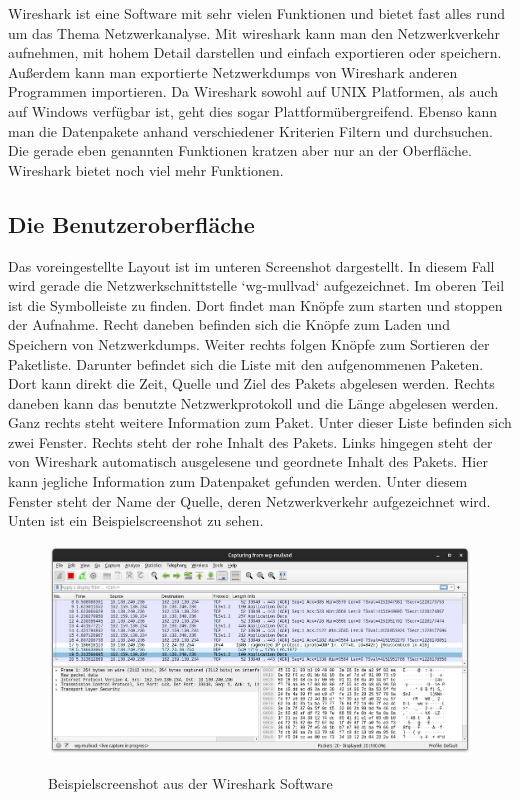 \documentclass[12pt]{article}
\begin{document}
Wireshark ist eine Software mit sehr vielen Funktionen und bietet fast alles rund um das Thema Netzwerkanalyse. Mit wireshark kann man den Netzwerkverkehr aufnehmen, mit hohem Detail darstellen und einfach exportieren oder speichern. Außerdem kann man exportierte Netzwerkdumps von Wireshark anderen Programmen importieren. Da Wireshark sowohl auf UNIX Platformen, als auch auf Windows verfügbar ist, geht dies sogar Plattformübergreifend. Ebenso kann man die Datenpakete anhand verschiedener Kriterien Filtern und durchsuchen. Die gerade eben genannten Funktionen kratzen aber nur an der Oberfläche. Wireshark bietet noch viel mehr Funktionen.\cite{features}

\subsection{Die Benutzeroberfläche}

Das voreingestellte Layout ist im unteren Screenshot dargestellt. In diesem Fall wird gerade die Netzwerkschnittstelle `wg-mullvad` aufgezeichnet. Im oberen Teil ist die Symbolleiste zu finden. Dort findet man Knöpfe zum starten und stoppen der Aufnahme.  Recht daneben befinden sich die Knöpfe zum Laden und Speichern von Netzwerkdumps. Weiter rechts folgen Knöpfe zum Sortieren der Paketliste. Darunter befindet sich die Liste mit den aufgenommenen Paketen. Dort kann direkt die Zeit, Quelle und Ziel des Pakets abgelesen werden. Rechts daneben kann das benutzte Netzwerkprotokoll und die Länge abgelesen werden. Ganz rechts steht weitere Information zum Paket. Unter dieser Liste befinden sich zwei Fenster. Rechts steht der rohe Inhalt des Pakets. Links hingegen steht der von Wireshark automatisch ausgelesene und geordnete Inhalt des Pakets. Hier kann jegliche Information zum Datenpaket gefunden werden. Unter diesem Fenster steht der Name der Quelle, deren Netzwerkverkehr aufgezeichnet wird. Unten ist ein Beispielscreenshot zu sehen.


\begin{figure}[h]
	\begin{center}
		\includegraphics[scale=0.25]{Bilder/Screenshot_1.png}
		\label{fig:figure2}
		\caption{Beispielscreenshot aus der Wireshark Software \cite{screenshots-self}}
	\end{center}
\end{figure}
\end{document}
